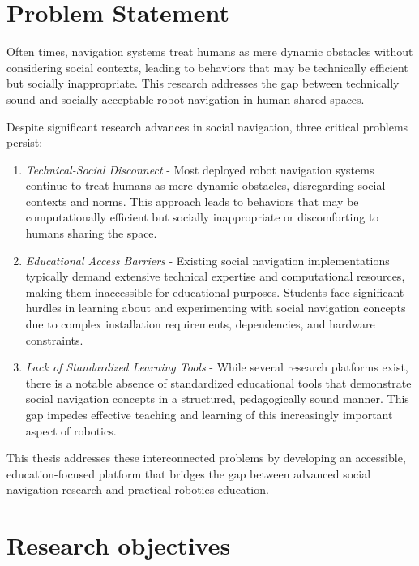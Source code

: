 \section{Problem Statement}
Often times, navigation systems treat humans as mere dynamic obstacles without 
considering social contexts, leading to behaviors that may be technically efficient 
but socially inappropriate. This research addresses the gap between technically 
sound and socially acceptable robot navigation in human-shared spaces. 

Despite significant research advances in social navigation, three critical problems persist:
\begin{enumerate}
    \item \textit{Technical-Social Disconnect} - Most deployed robot navigation systems continue to treat 
    humans as mere dynamic obstacles, disregarding social contexts and norms. This approach 
    leads to behaviors that may be computationally efficient but socially inappropriate or 
    discomforting to humans sharing the space.
    \item \textit{Educational Access Barriers} - Existing social navigation implementations typically demand 
    extensive technical expertise and computational resources, making them inaccessible for 
    educational purposes. Students face significant hurdles in learning about and 
    experimenting with social navigation concepts due to complex installation requirements, 
    dependencies, and hardware constraints.
    \item \textit{Lack of Standardized Learning Tools} - While several research platforms exist, there is a 
    notable absence of standardized educational tools that demonstrate social navigation 
    concepts in a structured, pedagogically sound manner. This gap impedes effective 
    teaching and learning of this increasingly important aspect of robotics.
\end{enumerate}

This thesis addresses these interconnected problems by developing an accessible, education-focused platform that bridges the gap between advanced social navigation research and practical robotics education.

\section{Research objectives}


